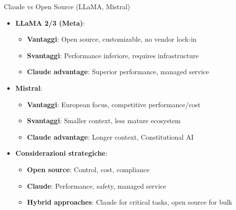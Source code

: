 \documentclass[aspectratio=169]{beamer}
\begin{document}
%
%
\begin{frame}{Claude vs Open Source (LLaMA, Mistral)}
\begin{itemize}
    \item \textbf{LLaMA 2/3 (Meta)}:
    \begin{itemize}
        \item \textbf{Vantaggi}: Open source, customizable, no vendor lock-in
        \item \textbf{Svantaggi}: Performance inferiore, requires infrastructure
        \item \textbf{Claude advantage}: Superior performance, managed service
    \end{itemize}
    
    \item \textbf{Mistral}:
    \begin{itemize}
        \item \textbf{Vantaggi}: European focus, competitive performance/cost
        \item \textbf{Svantaggi}: Smaller context, less mature ecosystem
        \item \textbf{Claude advantage}: Longer context, Constitutional AI
    \end{itemize}
    
    \item \textbf{Considerazioni strategiche}:
    \begin{itemize}
        \item \textbf{Open source}: Control, cost, compliance
        \item \textbf{Claude}: Performance, safety, managed service
        \item \textbf{Hybrid approaches}: Claude for critical tasks, open source for bulk
    \end{itemize}
\end{itemize}
\end{frame}
%
%
\end{document}
